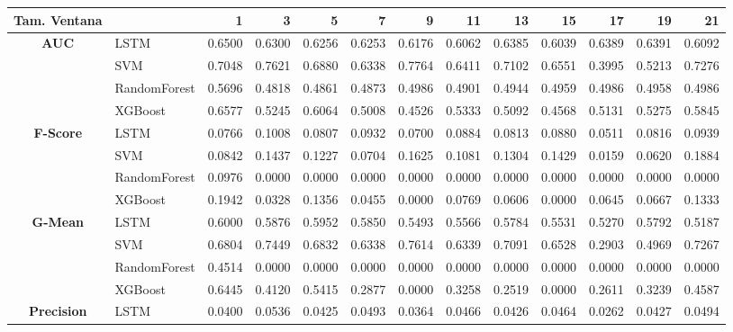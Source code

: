 \begin{table}[h]
	\centering
	\begin{adjustbox}{max width=15cm}
		\begin{tabular}{|c|l|r|r|r|r|r|r|r|r|r|r|r|}
			\hline
			\textbf{Tam. Ventana} &         &      1  &      3  &      5  &      7  &      9  &      11 &      13 &      15 &      17 &      19 &      21 \\
			\hline
			\textbf{AUC} & LSTM &  0.6500 &  0.6300 &  0.6256 &  0.6253 &  0.6176 &  0.6062 &  0.6385 &  0.6039 &  0.6389 &  0.6391 &  0.6092 \\
			& SVM &  0.7048 &  0.7621 &  0.6880 &  0.6338 &  0.7764 &  0.6411 &  0.7102 &  0.6551 &  0.3995 &  0.5213 &  0.7276 \\
			& RandomForest &  0.5696 &  0.4818 &  0.4861 &  0.4873 &  0.4986 &  0.4901 &  0.4944 &  0.4959 &  0.4986 &  0.4958 &  0.4986 \\
			& XGBoost &  0.6577 &  0.5245 &  0.6064 &  0.5008 &  0.4526 &  0.5333 &  0.5092 &  0.4568 &  0.5131 &  0.5275 &  0.5845 \\
			\hline
			\textbf{F-Score} & LSTM &  0.0766 &  0.1008 &  0.0807 &  0.0932 &  0.0700 &  0.0884 &  0.0813 &  0.0880 &  0.0511 &  0.0816 &  0.0939 \\
			& SVM &  0.0842 &  0.1437 &  0.1227 &  0.0704 &  0.1625 &  0.1081 &  0.1304 &  0.1429 &  0.0159 &  0.0620 &  0.1884 \\
			& RandomForest &  0.0976 &  0.0000 &  0.0000 &  0.0000 &  0.0000 &  0.0000 &  0.0000 &  0.0000 &  0.0000 &  0.0000 &  0.0000 \\
			& XGBoost &  0.1942 &  0.0328 &  0.1356 &  0.0455 &  0.0000 &  0.0769 &  0.0606 &  0.0000 &  0.0645 &  0.0667 &  0.1333 \\
			\hline
			\textbf{G-Mean} & LSTM &  0.6000 &  0.5876 &  0.5952 &  0.5850 &  0.5493 &  0.5566 &  0.5784 &  0.5531 &  0.5270 &  0.5792 &  0.5187 \\
			& SVM &  0.6804 &  0.7449 &  0.6832 &  0.6338 &  0.7614 &  0.6339 &  0.7091 &  0.6528 &  0.2903 &  0.4969 &  0.7267 \\
			& RandomForest &  0.4514 &  0.0000 &  0.0000 &  0.0000 &  0.0000 &  0.0000 &  0.0000 &  0.0000 &  0.0000 &  0.0000 &  0.0000 \\
			& XGBoost &  0.6445 &  0.4120 &  0.5415 &  0.2877 &  0.0000 &  0.3258 &  0.2519 &  0.0000 &  0.2611 &  0.3239 &  0.4587 \\
			\hline
			\textbf{Precision} & LSTM &  0.0400 &  0.0536 &  0.0425 &  0.0493 &  0.0364 &  0.0466 &  0.0426 &  0.0464 &  0.0262 &  0.0427 &  0.0494 \\

\end{tabular}
\end{adjustbox}
\end{table}
